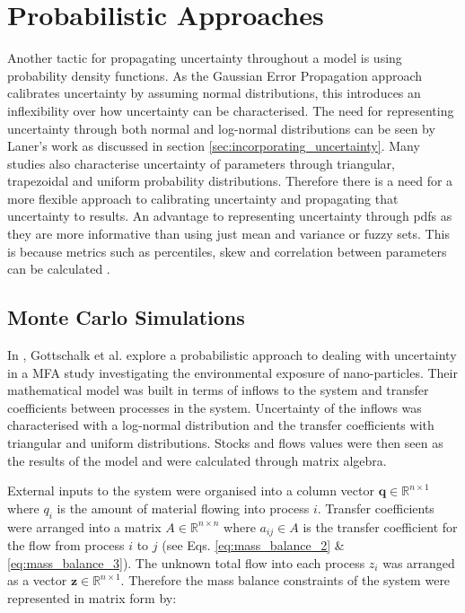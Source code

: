 \documentclass[ %
                    author={Tom Jager},
                supervisor={Dr. Daniel Schien},
                    degree={MEng},
                     title={A Bayesian Inference Engine for Calibrating Uncertainty over UMIS Structured MFA Systems},
                  subtitle={},
                      type={research},
                      year={2019} ]{dissertation}
\begin{document}
\section{Probabilistic Approaches}
Another tactic for propagating uncertainty throughout a model is using probability density functions. As the Gaussian Error Propagation approach calibrates uncertainty by assuming normal distributions, this introduces an inflexibility over how uncertainty can be characterised. The need for representing uncertainty through both normal and log-normal distributions can be seen by Laner's work as discussed in section \ref{sec:incorporating_uncertainty}. Many studies also characterise uncertainty of parameters through triangular, trapezoidal and uniform probability distributions\cite{wernet2016ecoinvent, gottschalk2010probabilistic}. Therefore there is a need for a more flexible approach to calibrating uncertainty and propagating that uncertainty to results. An advantage to representing uncertainty through pdfs as they are more informative than using just mean and variance or fuzzy sets. This is because metrics such as percentiles, skew and correlation between parameters can be calculated \cite{cencic2015general}.

\subsection{Monte Carlo Simulations}
In \cite{gottschalk2010probabilistic}, Gottschalk et al. explore a probabilistic approach to dealing with uncertainty in a MFA study investigating the environmental exposure of nano-particles. Their mathematical model was built in terms of inflows to the system and transfer coefficients between processes in the system. Uncertainty of the inflows was characterised with a log-normal distribution and the transfer coefficients with triangular and uniform distributions. Stocks and flows values were then seen as the results of the model and were calculated through matrix algebra.

External inputs to the system were organised into a column vector $\mathbf{q} \in \mathbb{R}^{n \times 1}$ where $q_i$ is the amount of material flowing into process $i$. Transfer coefficients were arranged into a matrix $A \in \mathbb{R}^{n \times n}$ where $a_{ij} \in A$ is the transfer coefficient for the flow from process $i$ to $j$ (see Eqs. \ref{eq:mass_balance_2} \& \ref{eq:mass_balance_3}). The unknown total flow into each process $z_i$ was arranged as a vector $\bm{z} \in \mathbb{R}^{n\times1}$. Therefore the mass balance constraints of the system were represented in matrix form by:
\end{document}
